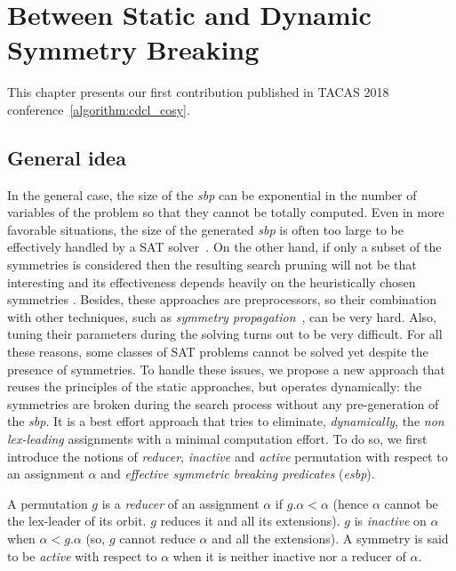\chapter{Between Static and Dynamic\\ Symmetry Breaking}\label{chap:symmSAT}
\minitoc

This chapter presents our first contribution published in TACAS 2018 conference~\ref{algorithm:cdcl_cosy}. 

\section{General idea}
In the general case,
the size of the \textit{sbp} can be exponential in the number of variables of
the problem so that they cannot be totally computed. Even in more favorable
situations, the size of the generated \textit{sbp} is often too large to be
effectively handled by a SAT solver~\cite{Luks2004}. On the other hand, if
only a subset of the symmetries is considered then the resulting search pruning
will not be that interesting and its effectiveness depends heavily on the
heuristically chosen symmetries \cite{biere2009handbook}. Besides, these approaches
are preprocessors, so their combination with other techniques, such as
\emph{symmetry propagation}~\cite{Devriendt12}, can be very hard. Also, tuning
their parameters during the solving turns out to be very difficult. For all
these reasons, some classes of SAT problems cannot be solved yet despite
the presence of symmetries.
To handle these issues, we propose a new
approach that reuses the principles of the static approaches, but operates
dynamically: the symmetries are broken during the search process without any
pre-generation of the \textit{sbp}. It is a best effort approach that tries to eliminate,
\textit{dynamically}, the \textit{non lex-leading} assignments with a minimal
computation effort. To do so, we first introduce the notions of
\textit{reducer}, \textit{inactive} and \textit{active} permutation with
respect to an assignment $\alpha$ and \emph{effective symmetric breaking predicates} (\emph{esbp}).


\begin{definition}
	 A permutation $g$	is a \emph{reducer} of an assignment $\alpha$ if $g.\alpha < \alpha$ 
	 (hence $\alpha$ cannot be the lex-leader of its orbit. $g$ reduces it and all its extensions). $g$ is
	\emph{inactive} on $\alpha$ when $\alpha < g.\alpha$ (so, $g$ cannot reduce $\alpha$ and all
	the extensions). A symmetry is said to be \emph{active} with respect to $\alpha$
	when it is neither inactive nor a reducer of $\alpha$. 
\end{definition}

